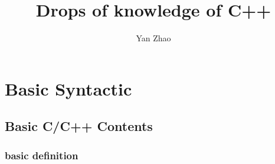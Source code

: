 \documentclass[a4paper,12pt,twoside]{book}
\begin{document}
\title{Drops of knowledge of C++}
\author{Yan Zhao}
\date{}\maketitle

\setcounter{secnumdepth}{4}
\setcounter{tocdepth}{4}
\tableofcontents
\chapter{Basic Syntactic}

\section{Basic C/C++ Contents}
\subsection{basic definition}
\end{document}
